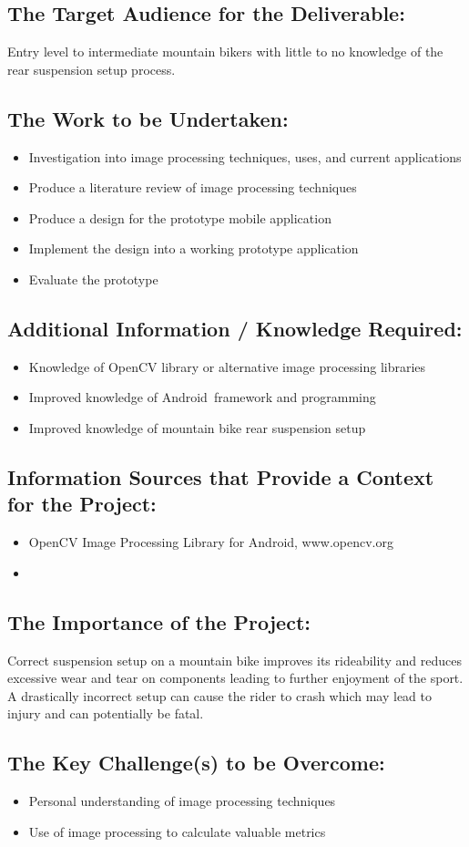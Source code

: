 \documentclass[a4paper, 12pt]{article}
\begin{document}
	\subsection[Audience]{The Target Audience for the Deliverable:}
	Entry level to intermediate mountain bikers with little to no knowledge of the rear suspension setup process.
	
	\subsection[Work]{The Work to be Undertaken:}
	\begin{itemize}
		\item Investigation into image processing techniques, uses, and current applications
		\item Produce a literature review of image processing techniques
		\item Produce a design for the prototype mobile application
		\item Implement the design into a working prototype application
		\item Evaluate the prototype
	\end{itemize}
	
	\subsection[Additional Info]{Additional Information / Knowledge Required:}
	\begin{itemize}
		\item Knowledge of OpenCV library or alternative image processing libraries
		\item Improved knowledge of Android\texttrademark\ framework and programming
		\item Improved knowledge of mountain bike rear suspension setup
	\end{itemize}
	
	\subsection[Sources]{Information Sources that Provide a Context for the Project:}
	\begin{itemize}
		\item OpenCV Image Processing Library for Android\texttrademark, www.opencv.org 
		\item 
	\end{itemize}
	
	\subsection[Importance]{The Importance of the Project:}
	Correct suspension setup on a mountain bike improves its rideability and reduces excessive wear and tear on components leading to further enjoyment of the sport. A drastically incorrect setup can cause the rider to crash which may lead to injury and can potentially be fatal.
	
	\subsection[Challenges]{The Key Challenge(s) to be Overcome:}
	\begin{itemize}
		\item Personal understanding of image processing techniques
		\item Use of image processing to calculate valuable metrics
	\end{itemize}
\end{document}
